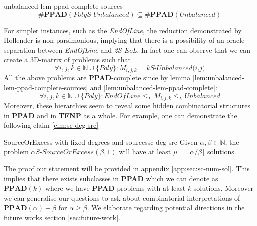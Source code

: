 \begin{lemmabox}{}{unbalanced-lem-ppad-complete-sources}
    $$
        \textbf{\#PPAD}(\textit{PolyS-Unbalanced}) \subseteq \textbf{\#PPAD}(\textit{Unbalanced})
    $$
\end{lemmabox}

For simpler instances, such as the \textit{EndOfLine}, the reduction
demonstrated by Hollender is non parsimonious, implying that there is a
possibility of an oracle separation between \textit{EndOfLine} and \textit{2S-EoL}.
In fact one can observe that we can create a 3D-matrix of problems such that
$$
    \forall i, j, k \in \mathbb{N} \cup \{\textit{Poly}\} : M_{i,j,k} = k\textit{S-Unbalanced(i,j)}
$$
All the above problems are \textbf{PPAD}-complete since by lemma \ref{lem:unbalanced-lem-ppad-complete-sources} and \ref{lem:unbalanced-lem-ppad-complete}:
$$
\forall i, j, k \in \mathbb{N} \cup \{\textit{Poly}\} : \textit{EndOfLine} \leq_L M_{i,j,k} \leq_L \textit{Unbalanced}
$$
Moreover, these hierarchies seem to reveal some hidden combinatorial structures in \textbf{PPAD} and in
\textbf{TFNP} as a whole.
For example, one can demonstrate the following claim \ref{clm:sc-deg-src}

\begin{claimbox}{SourceOrExcess with fixed degrees and sources}{sc-deg-src}
    Given $\alpha, \beta \in \mathbb{N}$, the problem $\alpha\textit{S-SourceOrExcess}(\beta,1)$ will have at least
    $\mu = \lceil \alpha/\beta \rceil$ solutions.
\end{claimbox}

The proof our statement will be provided in appendix \ref{app:sec:sc-num-sol}.
This implies that there exists subclasses in \textbf{PPAD} which we can denote as $\textbf{PPAD}(k)$ where we have \textbf{PPAD} problems with at least $k$ solutions.
Moreover we can generalise our questions to ask about combinatorial interpretations of $\textbf{PPAD}(\alpha)-\beta$ for $\alpha \geq \beta$.
We elaborate regarding potential directions in the future works section \ref{sec:future-work}.

